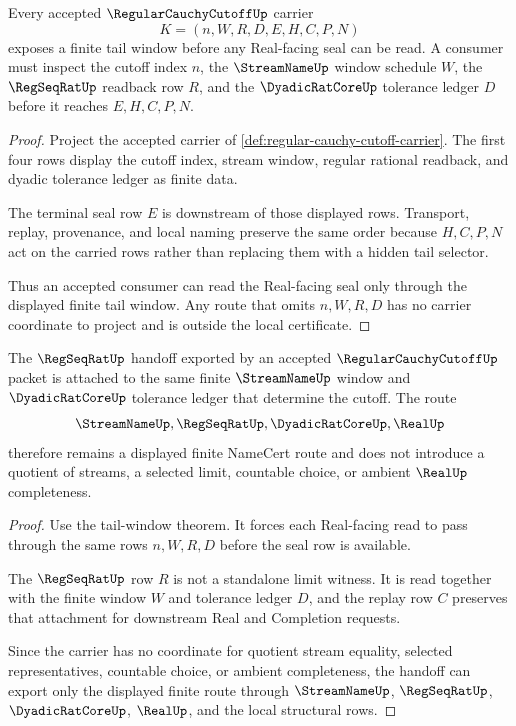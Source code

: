\begin{theorem}
\label{thm:regular-cauchy-cutoff-tail-window}
Every accepted $\RegularCauchyCutoffUp$ carrier
$$
K=(n,W,R,D,E,H,C,P,N)
$$
exposes a finite tail window before any Real-facing seal can be read. A consumer must inspect the cutoff index $n$, the $\StreamNameUp$ window schedule $W$, the $\RegSeqRatUp$ readback row $R$, and the $\DyadicRatCoreUp$ tolerance ledger $D$ before it reaches $E,H,C,P,N$.
\end{theorem}
\begin{proof}
Project the accepted carrier of \autoref{def:regular-cauchy-cutoff-carrier}. The first four rows display the cutoff index, stream window, regular rational readback, and dyadic tolerance ledger as finite data.

The terminal seal row $E$ is downstream of those displayed rows. Transport, replay, provenance, and local naming preserve the same order because $H,C,P,N$ act on the carried rows rather than replacing them with a hidden tail selector.

Thus an accepted consumer can read the Real-facing seal only through the displayed finite tail window. Any route that omits $n,W,R,D$ has no carrier coordinate to project and is outside the local certificate.
\end{proof}

\begin{theorem}
\label{thm:regular-cauchy-cutoff-regseqrat-handoff}
The $\RegSeqRatUp$ handoff exported by an accepted $\RegularCauchyCutoffUp$ packet is attached to the same finite $\StreamNameUp$ window and $\DyadicRatCoreUp$ tolerance ledger that determine the cutoff. The route
$$
\StreamNameUp,\RegSeqRatUp,\DyadicRatCoreUp,\RealUp
$$
therefore remains a displayed finite NameCert route and does not introduce a quotient of streams, a selected limit, countable choice, or ambient $\RealUp$ completeness.
\end{theorem}
\begin{proof}
Use the tail-window theorem. It forces each Real-facing read to pass through the same rows $n,W,R,D$ before the seal row is available.

The $\RegSeqRatUp$ row $R$ is not a standalone limit witness. It is read together with the finite window $W$ and tolerance ledger $D$, and the replay row $C$ preserves that attachment for downstream Real and Completion requests.

Since the carrier has no coordinate for quotient stream equality, selected representatives, countable choice, or ambient completeness, the handoff can export only the displayed finite route through $\StreamNameUp$, $\RegSeqRatUp$, $\DyadicRatCoreUp$, $\RealUp$, and the local structural rows.
\end{proof}

